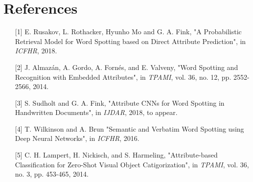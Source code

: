 \documentclass[a0,portrait]{a0poster}
\begin{document}
\section*{\sf \textbf{References}}
\vspace{-1cm}
\normalsize
\begin{itemize}[leftmargin=1.35em]
 \item[{[1]}] E. Rusakov, L. Rothacker, Hyunho Mo and G. A. Fink, "A Probabilistic Retrieval Model for Word Spotting 
 based on Direct Attribute Prediction", in {\em ICFHR}, 2018.
  
  \item[{[2]}] J. Almazán, A. Gordo, A. Fornés, and E. Valveny, "Word Spotting and Recognition with Embedded Attributes", 
  in {\em TPAMI}, vol. 36, no. 12, pp. 2552-2566, 2014.
  
  \item[{[3]}] S. Sudholt and G. A. Fink, "Attribute CNNs for Word Spotting in Handwritten Documents", 
  in {\em IJDAR}, 2018, to appear.
  
  \item[{[4]}] T. Wilkinson and A. Brun "Semantic and Verbatim Word Spotting using Deep Neural Networks", 
  in {\em ICFHR}, 2016.
  
  \item[{[5]}] C. H. Lampert, H. Nickisch, and S. Harmeling, "Attribute-based Classification for Zero-Shot Visual Object Catigorization", 
  in {\em TPAMI}, vol. 36, no. 3, pp. 453-465, 2014.

\end{itemize}
\end{document}
